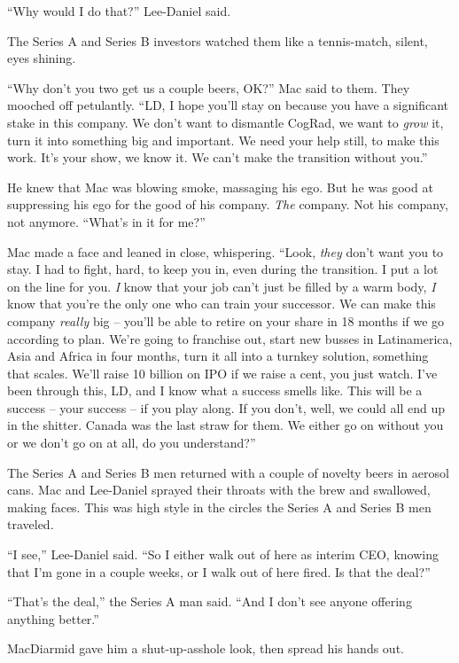 “Why would I do that?” Lee-Daniel said.

The Series A and Series B investors watched them like a tennis-match, 
silent, eyes shining.

“Why don't you two get us a couple beers, OK?” Mac said to them. 
They mooched off petulantly. “LD, I hope you'll stay on because you 
have a significant stake in this company. We don't want to dismantle 
CogRad, we want to \emph{grow} it, turn it into something big and 
important. We need your help still, to make this work. It's your show, 
we know it. We can't make the transition without you.”

He knew that Mac was blowing smoke, massaging his ego. But he was good 
at suppressing his ego for the good of his company. \emph{The} company. 
Not his company, not anymore. “What's in it for me?”

Mac made a face and leaned in close, whispering. “Look, \emph{they} 
don't want you to stay. I had to fight, hard, to keep you in, even 
during the transition. I put a lot on the line for you. \emph{I} know 
that your job can't just be filled by a warm body, \emph{I} know that 
you're the only one who can train your successor. We can make this 
company \emph{really} big -- you'll be able to retire on your share in 
18 months if we go according to plan. We're going to franchise out, 
start new busses in Latinamerica, Asia and Africa in four months, turn 
it all into a turnkey solution, something that scales. We'll raise 10 
billion on IPO if we raise a cent, you just watch. I've been through 
this, LD, and I know what a success smells like. This will be a success 
-- your success -- if you play along. If you don't, well, we could all 
end up in the shitter. Canada was the last straw for them. We either go 
on without you or we don't go on at all, do you understand?”

The Series A and Series B men returned with a couple of novelty beers 
in aerosol cans. Mac and Lee-Daniel sprayed their throats with the brew 
and swallowed, making faces. This was high style in the circles the 
Series A and Series B men traveled.

“I see,” Lee-Daniel said. “So I either walk out of here as 
interim CEO, knowing that I'm gone in a couple weeks, or I walk out of 
here fired. Is that the deal?”

“That's the deal,” the Series A man said. “And I don't see anyone 
offering anything better.”

MacDiarmid gave him a shut-up-asshole look, then spread his hands out.

